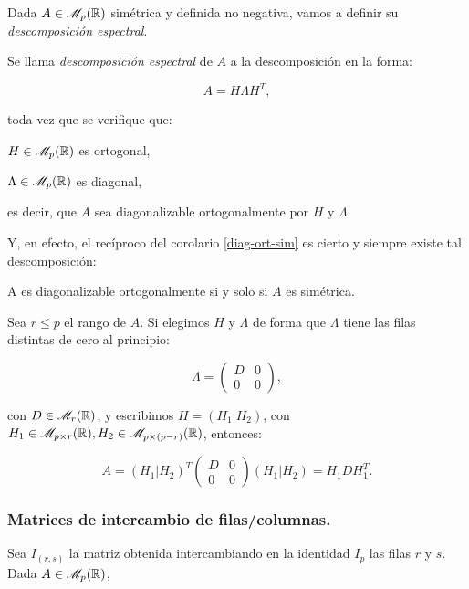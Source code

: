 Dada $A\in \mathscr{M}_{p}(\mathbb{R})$ simétrica y definida no negativa, vamos a definir su \emph{descomposición espectral}.

\begin{ndef}
  Se llama \emph{descomposición espectral} de $A$ a la descomposición en la forma:

  \[
  A = H\Lambda H^T,
  \]

  toda vez que se verifique que:
  \begin{nlist}
  \item $H\in \mathscr{M}_{p}(\mathbb{R})$ es ortogonal,
  \item $\Lambda\in \mathscr{M}_{p}(\mathbb{R})$ es diagonal,
  \end{nlist}

  es decir, que $A$ sea diagonalizable ortogonalmente por $H$ y $\Lambda$.
\end{ndef}

Y, en efecto, el recíproco del corolario \ref{diag-ort-sim} es cierto y siempre existe tal descomposición:

\begin{nth}
  A es diagonalizable ortogonalmente si y solo si $A$ es simétrica.
\end{nth}

Sea $r \le p$ el rango de $A$. Si elegimos $H$ y $\Lambda$ de forma que $\Lambda$ tiene las filas distintas de cero
al principio:

\[
  \Lambda = 
  \begin{pmatrix}
    D & 0 \\
    0 & 0
  \end{pmatrix},
\]

con $D \in \mathscr{M}_r(\mathbb{R})$, y escribimos $H = (H_1 | H_2)$, con $H_1\in \mathscr{M}_{p\times r}(\mathbb{R}), H_2\in \mathscr{M}_{p\times (p-r)}(\mathbb{R})$,
entonces:

\[
  A = (H_1 | H_2)^T \begin{pmatrix}
    D & 0 \\
    0 & 0
  \end{pmatrix} (H_1 | H_2) = H_1 D H_1^T.
\]

\subsubsection{Matrices de intercambio de filas/columnas.}

Sea $I_{(r,s)}$ la matriz obtenida intercambiando en la identidad $I_p$ las filas $r$ y $s$. Dada $A\in \mathscr{M}_{p}(\mathbb{R})$,

